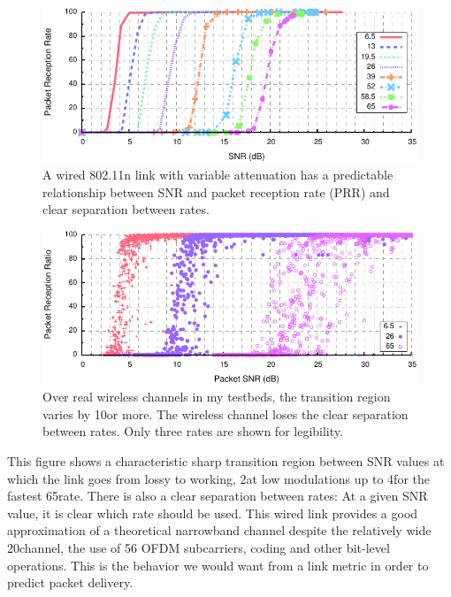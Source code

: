 \begin{figure}[t!]
	\centering
	\includegraphics[width=\textwidth]{figures/approach/snr_prr_atten.pdf}
	\caption[SNR vs. PRR for a wired 802.11n link]{\label{fig:snr_prr_attenuator}A wired 802.11n link with variable attenuation has a predictable relationship between SNR and packet reception rate (PRR) and clear separation between rates.}
\end{figure}
\begin{figure}[t!]
	\centering
	\includegraphics[width=\textwidth]{figures/approach/snr_prr_scatter.pdf}
	\caption[SNR vs. PRR for many wireless 802.11n channels]{\label{fig:snr_prr_26_65} Over real wireless channels in my testbeds, the transition region varies by 10\dB or more. The wireless channel loses the clear separation between rates. Only three rates are shown for legibility.}%
\end{figure}

This figure shows a characteristic sharp transition region between SNR values at which the link goes from lossy to working, 2\dB at low modulations up to 4\dB for the fastest 65\Mbps rate. There is also a clear separation between rates: At a given SNR value, it is clear which rate should be used. This wired link provides a good approximation of a theoretical narrowband channel despite the relatively wide 20\MHz channel, the use of 56 OFDM subcarriers, coding and other bit-level operations. This is the behavior we would want from a link metric in order to predict packet delivery.


